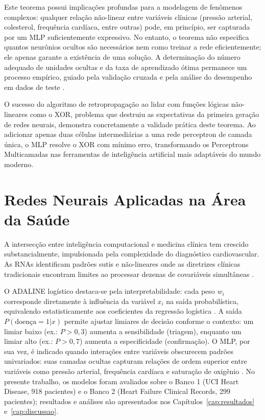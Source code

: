 Este teorema possui implicações profundas para a modelagem de fenômenos complexos: qualquer relação não-linear entre variáveis clínicas (pressão arterial, colesterol, frequência cardíaca, entre outras) pode, em princípio, ser capturada por um MLP suficientemente expressivo. No entanto, o teorema não especifica quantos neurônios ocultos são necessários nem como treinar a rede eficientemente; ele apenas garante a existência de uma solução. A determinação do número adequado de unidades ocultas e da taxa de aprendizado ótima permanece um processo empírico, guiado pela validação cruzada e pela análise do desempenho em dados de teste \cite{silva2016}.

O sucesso do algoritmo de retropropagação ao lidar com funções lógicas não-lineares como o XOR, problema que destruiu as expectativas da primeira geração de redes neurais, demonstra concretamente a validade prática deste teorema. Ao adicionar apenas duas células intermediárias a uma rede perceptron de camada única, o MLP resolve o XOR com mínimo erro, transformando os Perceptrons Multicamadas nas ferramentas de inteligência artificial mais adaptáveis do mundo moderno.

\section{Redes Neurais Aplicadas na Área da Saúde}

A intersecção entre inteligência computacional e medicina clínica tem crescido substancialmente, impulsionada pela complexidade do diagnóstico cardiovascular. As RNAs identificam padrões sutis e não-lineares onde as diretrizes clínicas tradicionais encontram limites ao processar dezenas de covariáveis simultâneas \cite{silva2016,braga2007}.

O ADALINE logístico destaca-se pela interpretabilidade: cada peso $w_i$ corresponde diretamente à influência da variável $x_i$ na saída probabilística, equivalendo estatisticamente aos coeficientes da regressão logística \cite{silva2016}. A saída $P(\text{doença} = 1 | x)$ permite ajustar limiares de decisão conforme o contexto: um limiar baixo (ex.: $P > 0{,}3$) aumenta a sensibilidade (triagem), enquanto um limiar alto (ex.: $P > 0{,}7$) aumenta a especificidade (confirmação). O MLP, por sua vez, é indicado quando interações entre variáveis obscurecem padrões univariados: suas camadas ocultas capturam relações de ordem superior entre variáveis como pressão arterial, frequência cardíaca e saturação de oxigênio \cite{braga2007}. No presente trabalho, os modelos foram avaliados sobre o Banco 1 (UCI Heart Disease, 918 pacientes) e o Banco 2 (Heart Failure Clinical Records, 299 pacientes); resultados e análises são apresentados nos Capítulos~\ref{cap:resultados} e~\ref{cap:discussao}.

